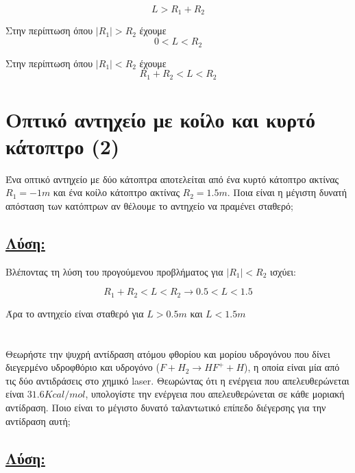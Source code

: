 \documentclass[a4paper,11pt,titlepage]{article}
\numberwithin{equation}{section} %
\begin{document}
\begin{equation*}
 L>R_1+R_2
\end{equation*}

Στην περίπτωση όπου $|R_1|>R_2$ έχουμε 
\begin{equation*}
 0<L<R_2
\end{equation*}

Στην περίπτωση όπου $|R_1|<R_2$ έχουμε 
\begin{equation*}
 R_1+R_2<L<R_2
\end{equation*}
\newpage
\section{Οπτικό αντηχείο με κοίλο και κυρτό κάτοπτρο (2)}

Ένα οπτικό αντηχείο με δύο κάτοπτρα αποτελείται από ένα κυρτό κάτοπτρο ακτίνας $R_1=-1m$ και ένα κοίλο κάτοπτρο ακτίνας $R_2=1.5m$. Ποια είναι η μέγιστη δυνατή απόσταση των κατόπτρων αν θέλουμε το αντηχείο να πραμένει σταθερό;

\subsection*{\underline{Λύση:}}

Βλέποντας τη λύση του προγούμενου προβλήματος για $|R_1|<R_2$ ισχύει:

\begin{equation*}
 R_1+R_2<L<R_2\longrightarrow 0.5<L<1.5
\end{equation*}

Άρα το αντηχείο είναι σταθερό για $L>0.5m$ και $L<1.5m$

\section{}

Θεωρήστε την ψυχρή αντίδραση ατόμου φθορίου και μορίου υδρογόνου που δίνει διεγερμένο υδροφθόριο και υδρογόνο ($F+H_2\rightarrow HF^++H$), η οποία είναι μία από τις δύο αντιδράσεις στο χημικό laser. Θεωρώντας ότι η ενέργεια που απελευθερώνεται είναι $31.6Kcal/mol$, υπολογίστε την ενέργεια που απελευθερώνεται σε κάθε μοριακή αντίδραση. Ποιο είναι το μέγιστο δυνατό ταλαντωτικό επίπεδο διέγερσης για την αντίδραση αυτή;

\subsection*{\underline{Λύση:}}
\end{document}
